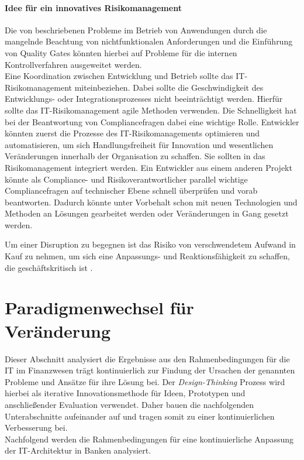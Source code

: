 \paragraph{Idee für ein innovatives Risikomanagement}
Die von \citet{mci/Disterer2011} beschriebenen Probleme im Betrieb von Anwendungen durch die mangelnde Beachtung von nichtfunktionalen Anforderungen und die Einführung von Quality Gates könnten hierbei auf Probleme für die internen Kontrollverfahren ausgeweitet werden. 
\medskip
\\
Eine Koordination zwischen Entwicklung und Betrieb sollte das IT-Risikomanagement miteinbeziehen. Dabei sollte die Geschwindigkeit des Entwicklungs- oder Integrationsprozesses nicht beeinträchtigt werden. Hierfür sollte das IT-Risikomanagement agile Methoden verwenden. Die Schnelligkeit hat bei der Beantwortung von Compliancefragen dabei eine wichtige Rolle. Entwickler könnten zuerst die Prozesse des IT-Risikomanagements optimieren und automatisieren, um sich Handlungsfreiheit für Innovation und wesentlichen Veränderungen innerhalb der Organisation zu schaffen. Sie sollten in das Risikomanagement integriert werden. Ein Entwickler aus einem anderen Projekt könnte als Compliance- und Risikoverantwortlicher parallel wichtige Compliancefragen auf technischer Ebene schnell überprüfen und vorab beantworten. Dadurch könnte unter Vorbehalt schon mit neuen Technologien und Methoden an Lösungen gearbeitet werden oder Veränderungen in Gang gesetzt werden. 

Um einer Disruption zu begegnen ist das Risiko von verschwendetem Aufwand in Kauf zu nehmen, um sich eine Anpassungs- und Reaktionsfähigkeit zu schaffen, die geschäftskritisch ist \cite{Bussmann2006}.


\section{Paradigmenwechsel für Veränderung}
Dieser Abschnitt analysiert die Ergebnisse aus den Rahmenbedingungen für die IT im Finanzwesen trägt kontinuierlich zur Findung der Ursachen der genannten Probleme und Ansätze für ihre Lösung bei. Der \emph{Design-Thinking} Prozess wird hierbei als iterative Innovationsmethode für Ideen, Prototypen und anschließender Evaluation verwendet. Daher bauen die nachfolgenden Unterabschnitte aufeinander auf und tragen somit zu einer kontinuierlichen Verbesserung bei.
\medskip
\\
Nachfolgend werden die Rahmenbedingungen für eine kontinuierliche Anpassung der IT-Architektur in Banken analysiert.

